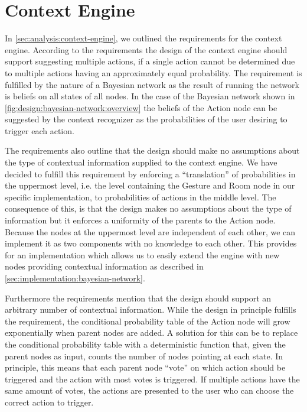 \section{Context Engine}
\label{sec:design:context-engine}

In \cref{sec:analysis:context-engine}, we outlined the requirements for the context engine. According to the requirements the design of the context engine should support suggesting multiple actions, if a single action cannot be determined due to multiple actions having an approximately equal probability. The requirement is fulfilled by the nature of a Bayesian network as the result of running the network is beliefs on all states of all nodes. In the case of the Bayesian network shown in \cref{fig:design:bayesian-network:overview} the beliefs of the Action node can be suggested by the context recognizer as the probabilities of the user desiring to trigger each action.

The requirements also outline that the design should make no assumptions about the type of contextual information supplied to the context engine. We have decided to fulfill this requirement by enforcing a ``translation'' of probabilities in the uppermost level, i.e. the level containing the Gesture and Room node in our specific implementation, to probabilities of actions in the middle level.
The consequence of this, is that the design makes no assumptions about the type of information but it enforces a uniformity of the parents to the Action node.
Because the nodes at the uppermost level are independent of each other, we can implement it as two components with no knowledge to each other. This provides for an implementation which allows us to easily extend the engine with new nodes providing contextual information as described in \cref{sec:implementation:bayesian-network}.

Furthermore the requirements mention that the design should support an arbitrary number of contextual information. While the design in principle fulfills the requirement, the conditional probability table of the Action node will grow exponentially when parent nodes are added.
A solution for this can be to replace the conditional probability table with a deterministic function that, given the parent nodes as input, counts the number of nodes pointing at each state. In principle, this means that each parent node ``vote'' on which action should be triggered and the action with most votes is triggered. If multiple actions have the same amount of votes, the actions are presented to the user who can choose the correct action to trigger.

